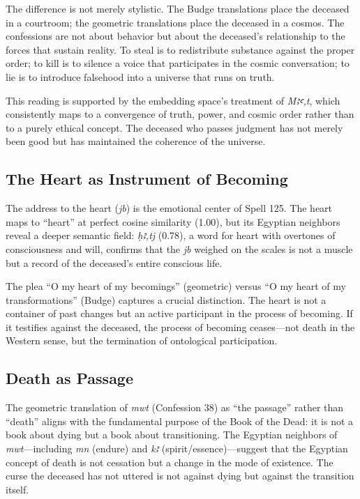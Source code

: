 \documentclass[11pt, a4paper]{article}
\begin{document}
The difference is not merely stylistic. The Budge translations place the deceased in a courtroom; the geometric translations place the deceased in a cosmos. The confessions are not about behavior but about the deceased's relationship to the forces that sustain reality. To steal is to redistribute substance against the proper order; to kill is to silence a voice that participates in the cosmic conversation; to lie is to introduce falsehood into a universe that runs on truth.

This reading is supported by the embedding space's treatment of \textit{Mꜣꜥ,t}, which consistently maps to a convergence of truth, power, and cosmic order rather than to a purely ethical concept. The deceased who passes judgment has not merely been good but has maintained the coherence of the universe.

\subsection{The Heart as Instrument of Becoming}

The address to the heart (\textit{jb}) is the emotional center of Spell 125. The heart maps to ``heart'' at perfect cosine similarity (1.00), but its Egyptian neighbors reveal a deeper semantic field: \textit{ḥꜣ,tj} (0.78), a word for heart with overtones of consciousness and will, confirms that the \textit{jb} weighed on the scales is not a muscle but a record of the deceased's entire conscious life.

The plea ``O my heart of my becomings'' (geometric) versus ``O my heart of my transformations'' (Budge) captures a crucial distinction. The heart is not a container of past changes but an active participant in the process of becoming. If it testifies against the deceased, the process of becoming ceases---not death in the Western sense, but the termination of ontological participation.

\subsection{Death as Passage}

The geometric translation of \textit{mwt} (Confession 38) as ``the passage'' rather than ``death'' aligns with the fundamental purpose of the Book of the Dead: it is not a book about dying but a book about transitioning. The Egyptian neighbors of \textit{mwt}---including \textit{mn} (endure) and \textit{kꜣ} (spirit/essence)---suggest that the Egyptian concept of death is not cessation but a change in the mode of existence. The curse the deceased has not uttered is not against dying but against the transition itself.
\end{document}
